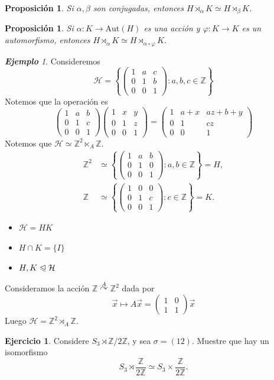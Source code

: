 \documentclass{article}
\newtheorem{proposition}[theorem]{Proposición}
\theoremstyle{definition}
\newtheorem{exercise}{Ejercicio}
\theoremstyle{remark}
\newtheorem{example}[theorem]{\textbf{Ejemplo}}
\numberwithin{equation}{section}
\newcommand{\Z}{\mathbb{Z}}
\renewcommand{\a}{\alpha}
\newcommand{\vphi}{\varphi}
\newcommand{\acts}{\curvearrowright}
\newcommand{\actsby}[1]{\stackrel{#1}{\acts}}
\newcommand{\normal}{\trianglelefteqslant}
\newcommand{\Aut}{\mathrm{Aut}}
\newcommand{\set}[1]{\left\{ #1 \right\}}
\newcommand{\matr}[1]{\begin{pmatrix}#1\end{pmatrix}}
\newcommand{\znz}[1]{\frac{\Z}{#1 \Z}}
\newcommand{\zmz}[1]{\Z/ #1 \Z}
\begin{document}
\begin{proposition}
  Si $\a,\beta$ son conjugadas, entonces $H \rtimes_\a K \simeq H \rtimes_\beta K$.
\end{proposition}

\begin{proposition}
  Si $\a \colon K \to \Aut(H)$ es una acción y $\vphi \colon K \to K$ es un automorfismo, entonces $H \rtimes_\a K \simeq H \rtimes_{\a \circ \vphi} K$.
\end{proposition}

\renewcommand{\H}{\mathcal{H}}

\begin{example}
  Consideremos
  \[\H = \set{\matr{1 & a & c \\ 0 & 1 & b \\ 0 & 0 & 1} \colon a,b,c \in \Z}\]
  Notemos que la operación es
  \[\matr{1&a&b \\ 0&1&c \\ 0&0&1} \matr{1&x&y \\ 0&1&z \\ 0&0&1} = \matr{1 & a+x & az+b+y \\ 0 & 1 & cz \\ 0 & 0 & 1}\]
  Notemos que $\H \simeq \Z^2 \ltimes_A \Z$.
  \begin{align*}
    \Z^2 &\simeq \set{\matr{1&a&b \\ 0 & 1 & 0 \\ 0 & 0 & 1} \colon a,b \in \Z} = H, \\
    \Z &\simeq \set{\matr{1&0&0 \\ 0&1&c \\ 0&0&1} \colon c \in \Z} = K.
  \end{align*}
  \begin{itemize}
    \item $\H = HK$ %
    \item $H \cap K = \{I\}$ %
    \item $H,K \normal \H$ %
  \end{itemize}
  Consideramos la acción $\Z \actsby A \Z^2$ dada por
  \[\vec x \mapsto A \vec x = \matr{1&0\\1&1} \vec x\]
  Luego $\H = \Z^2 \rtimes_A \Z$.
\end{example}

\begin{exercise}
  Considere $S_3 \rtimes \zmz2$, y sea $\sigma = (12)$. Muestre que hay un isomorfismo
  \[S_3 \rtimes \znz 2 \simeq S_3 \times \znz 2.\]
\end{exercise}
\end{document}
